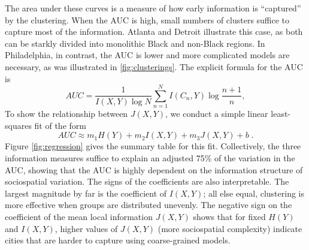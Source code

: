\documentclass[9pt,twocolumn,twoside]{pnas-new}
\begin{document}
	The area under these curves is a measure of how early information is ``captured'' by the clustering. When the AUC is high, small numbers of clusters suffice to capture most of the information. Atlanta and Detroit illustrate this case, as both can be starkly divided into monolithic Black and non-Black regions. In Philadelphia, in contrast, the AUC is lower and more complicated models are necessary, as was illustrated in \ref{fig:clusterings}. The explicit formula for the AUC is
	\begin{equation}
		AUC = \frac{1}{I(X,Y) \log N} \sum_{n=1}^N I(C_n, Y) \log \frac{n+1}{n}, \label{eq:AUC_formula}
	\end{equation}
	To show the relationship between $J(X,Y)$, we conduct a simple linear least-squares fit of the form
		\begin{equation*}
			AUC \approx m_1H(Y) + m_2I(X,Y) + m_3J(X,Y) + b\;.
		\end{equation*}
	Figure \ref{fig:regression} gives the summary table for this fit. Collectively, the three information measures suffice to explain an adjusted 75\% of the variation in the AUC, showing that the AUC is highly dependent on the information structure of sociospatial variation. The signs of the coefficients are also interpretable. The largest magnitude by far is the coefficient of $I(X,Y)$; all else equal, clustering is more effective when groups are distributed unevenly. The negative sign on the coefficient of the mean local information $J(X,Y)$ shows that for fixed $H(Y)$ and $I(X,Y)$, higher values of $J(X,Y)$ (more sociospatial complexity) indicate cities that are harder to capture using coarse-grained models. 
\end{document}
